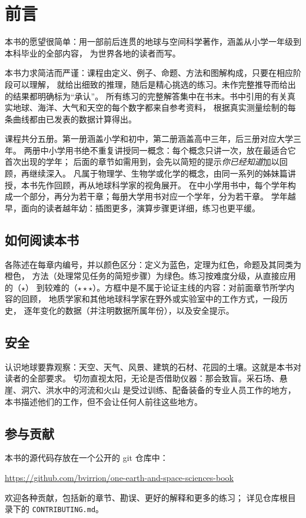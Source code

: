 \chapter{前言}

本书的愿望很简单：用一部前后连贯的地球与空间科学著作，涵盖从小学一年级到本科毕业的全部内容，
为世界各地的读者而写。

本书力求简洁而严谨：课程由定义、例子、命题、方法和图解构成，只要在相应阶段可以理解，
就给出细致的推理，随后是精心挑选的练习。未作完整推导而给出的结果都明确标为“承认”。
所有练习的完整解答集中在书末。书中引用的有关真实地球、海洋、大气和天空的每个数字都来自参考资料，
根据真实测量绘制的每条曲线都由已发表的数据计算得出。

课程共分五册。第一册涵盖小学和初中，第二册涵盖高中三年，后三册对应大学三年。
两册中小学用书绝不重复讲授同一概念：每个概念只讲一次，放在最适合它首次出现的学年；
后面的章节如需用到，会先以简短的提示\emph{你已经知道}加以回顾，再继续深入。
凡属于物理学、生物学或化学的概念，由同一系列的姊妹篇讲授，本书先作回顾，再从地球科学家的视角展开。
在中小学用书中，每个学年构成一个部分，再分为若干章；每册大学用书对应一个学年，分为若干章。
学年越早，面向的读者越年幼：插图更多，演算步骤更详细，练习也更平缓。

\section*{如何阅读本书}

各陈述在每章内编号，并以颜色区分：定义为蓝色，定理为红色，命题及其同类为橙色，
方法（处理常见任务的简短步骤）为绿色。练习按难度分级，从直接应用的（$\star$）
到较难的（$\star\star\star$）。方框中是不属于论证主线的内容：对前面章节所学内容的回顾，
地质学家和其他地球科学家在野外或实验室中的工作方式，一段历史，
逐年变化的数据（并注明数据所属年份），以及安全提示。

\section*{安全}

认识地球要靠观察：天空、天气、风景、建筑的石材、花园的土壤。这就是本书对读者的全部要求。
切勿直视太阳，无论是否借助仪器：那会致盲。采石场、悬崖、洞穴、洪水中的河流和火山
是受过训练、配备装备的专业人员工作的地方，本书描述他们的工作，但不会让任何人前往这些地方。

\section*{参与贡献}

本书的源代码存放在一个公开的 git 仓库中：
\begin{center}
\url{https://github.com/bvirrion/one-earth-and-space-sciences-book}
\end{center}
欢迎各种贡献，包括新的章节、勘误、更好的解释和更多的练习；
详见仓库根目录下的 \texttt{CONTRIBUTING.md}。
